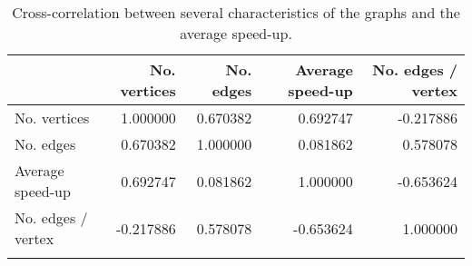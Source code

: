 \begin{table}[h]
\centering
 \caption{Cross-correlation between several characteristics of the graphs and the average speed-up.}
\begin{tabular}{lrrrr}
\toprule
{} &  No. vertices &   No. edges &      Average speed-up &  No. edges / vertex \\
\midrule
No. vertices       &    1.000000 &  0.670382 &  0.692747 &         -0.217886 \\
No. edges          &    0.670382 &  1.000000 &  0.081862 &          0.578078 \\
Average speed-up             &    0.692747 &  0.081862 &  1.000000 &         -0.653624 \\
No. edges / vertex &   -0.217886 &  0.578078 & -0.653624 &          1.000000 \\
\bottomrule
\label{tab:mst corr}
\end{tabular}
\end{table}